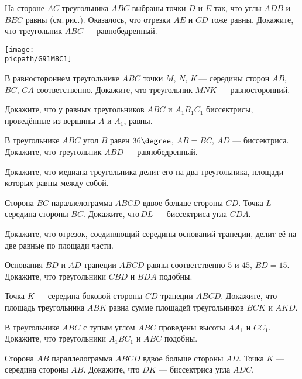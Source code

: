 \begin{consultation}
	\begin{listofex}
		\item \begin{minipage}[t]{\bodywidth}
			На стороне \( AC \) треугольника \( ABC \) выбраны точки \( D \) и \( E \) так, что углы \( ADB \) и \( BEC \) равны (см. рис.). Оказалось, что отрезки \( AE \) и \( CD \) тоже равны. Докажите, что треугольник \( ABC \) --- равнобедренный.
		\end{minipage}
		\gapwidth
		\begin{minipage}[t]{\picwidth}
			\texttt{[image: \\picpath/G91M8C1]}
		\end{minipage}
		\item В равностороннем треугольнике \( ABC \) точки \( M \), \( N \), \( K \) --- середины сторон \( AB \), \( BC \), \( CA \) соответственно. Докажите, что треугольник \( MNK \) --- равносторонний.
		\item Докажите, что у равных треугольников \( ABC \) и \( A_1B_1C_1 \) биссектрисы, проведённые из вершины  \( A \) и \( A_1 \), равны.
		\item В треугольнике \( ABC \) угол \( B \) равен \( 36\degree \), \( AB=BC \), \( AD \) --- биссектриса. Докажите, что треугольник \( ABD \) --- равнобедренный.
		\item Докажите, что медиана треугольника делит его на два треугольника, площади которых равны между собой.
		\item Сторона \( BC \) параллелограмма \( ABCD \) вдвое больше стороны \( CD \). Точка \( L \) --- середина стороны \( BC \). Докажите, что \( DL \) --- биссектриса угла \( CDA \).
		\item Докажите, что отрезок, соединяющий середины оснований трапеции, делит её на две равные по площади части.
	\end{listofex}
\end{consultation}

\begin{consultation}
	\begin{listofex}
		\item Основания \( BD \) и \( AD \) трапеции \( ABCD \) равны соответственно \( 5 \) и \( 45 \), \( BD=15 \). Докажите, что треугольники \( CBD \) и \( BDA \) подобны.
		\item Точка \( K \) --- середина боковой стороны \( CD \) трапеции \( ABCD \). Докажите, что площадь треугольника \( ABK \) равна сумме площадей треугольников \( BCK \) и \( AKD \).
		\item В треугольнике \( ABC \) с тупым углом \( ABC \) проведены высоты \( AA_1 \) и \( CC_1 \). Докажите, что треугольники \( A_1BC_1 \) и \( ABC \) подобны.\\
		\item Сторона \( AB \) параллелограмма \( ABCD \) вдвое больше стороны \( AD \). Точка \( K \) --- середина стороны \( AB \). Докажите, что \( DK \) --- биссектриса угла \( ADC \).
	\end{listofex}
\end{consultation}
